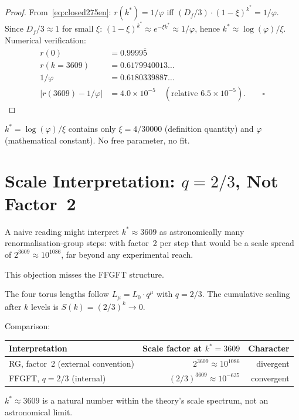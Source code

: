 \begin{proof}
From~\eqref{eq:closed275en}: $r(k^*) = 1/\varphi$ iff
$(D_f/3)\cdot(1-\xi)^{k^*} = 1/\varphi$.
Since $D_f/3 \approx 1$ for small $\xi$:
$(1-\xi)^{k^*} \approx e^{-\xi k^*} \approx 1/\varphi$,
hence $k^* \approx \log(\varphi)/\xi$.
Numerical verification:
\begin{align*}
  r(0)      &= 0.9999\overline{5} \\
  r(k{=}3609) &= 0.6179940013\ldots \\
  1/\varphi &= 0.6180339887\ldots \\
  |r(3609)-1/\varphi| &= 4.0\times10^{-5}
  \quad(\text{relative } 6.5\times10^{-5}). \qquad\square
\end{align*}
\end{proof}

\begin{remark}
$k^* = \log(\varphi)/\xi$ contains only $\xi = 4/30000$
(definition quantity) and $\varphi$ (mathematical constant).
No free parameter, no fit.
\end{remark}

\section{Scale Interpretation: $q=2/3$, Not Factor~2}

\begin{remark}\label{rem:scale275en}
A naive reading might interpret $k^* \approx 3609$ as astronomically many
renormalisation-group steps: with factor~2 per step that would be a scale
spread of $2^{3609} \approx 10^{1086}$, far beyond any experimental reach.

This objection misses the FFGFT structure.
\end{remark}

The four torus lengths follow $L_\mu = L_0\cdot q^\mu$ with $q = 2/3$.
The cumulative scaling after $k$ levels is $S(k) = (2/3)^k \to 0$.

\begin{proposition}\label{prop:conv275en}
Comparison:
\begin{center}
\begin{tabular}{@{}lrr@{}}
\toprule
Interpretation & Scale factor at $k^*=3609$ & Character \\
\midrule
RG, factor~2 (external convention) & $2^{3609}\approx 10^{1086}$ & divergent \\
FFGFT, $q=2/3$ (internal)          & $(2/3)^{3609}\approx 10^{-635}$ & convergent \\
\bottomrule
\end{tabular}
\end{center}
$k^* \approx 3609$ is a natural number within the theory's scale spectrum,
not an astronomical limit.
\end{proposition}

